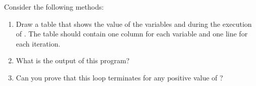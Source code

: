 \begin{exercise}  %

Consider the following methods:


\begin{enumerate}

\item Draw a table that shows the value of the variables  and  during the execution of .
The table should contain one column for each variable and one line for each iteration.

\item What is the output of this program?

\item Can you prove that this loop terminates for any positive value of ?



\end{enumerate}

\end{exercise}


